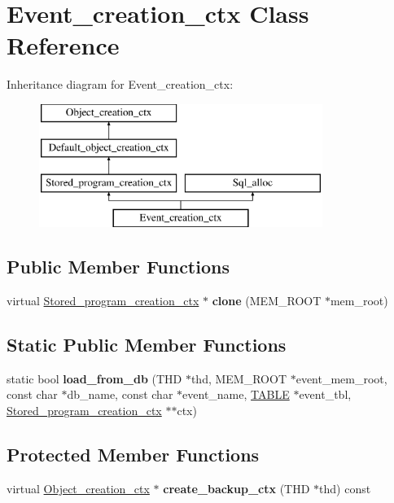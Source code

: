 \hypertarget{classEvent__creation__ctx}{}\section{Event\+\_\+creation\+\_\+ctx Class Reference}
\label{classEvent__creation__ctx}
Inheritance diagram for Event\+\_\+creation\+\_\+ctx\+:\begin{figure}[H]
\begin{center}
\leavevmode
\includegraphics[height=4.000000cm]{classEvent__creation__ctx}
\end{center}
\end{figure}
\subsection*{Public Member Functions}
\begin{DoxyCompactItemize}
\item 
\mbox{\label{classEvent__creation__ctx_abeef070386db4889aef81d6ff39d7818}} 
virtual \mbox{\hyperlink{classStored__program__creation__ctx}{Stored\+\_\+program\+\_\+creation\+\_\+ctx}} $\ast$ {\bfseries clone} (M\+E\+M\+\_\+\+R\+O\+OT $\ast$mem\+\_\+root)
\end{DoxyCompactItemize}
\subsection*{Static Public Member Functions}
\begin{DoxyCompactItemize}
\item 
static bool {\bfseries load\+\_\+from\+\_\+db} (T\+HD $\ast$thd, M\+E\+M\+\_\+\+R\+O\+OT $\ast$event\+\_\+mem\+\_\+root, const char $\ast$db\+\_\+name, const char $\ast$event\+\_\+name, \mbox{\hyperlink{structTABLE}{T\+A\+B\+LE}} $\ast$event\+\_\+tbl, \mbox{\hyperlink{classStored__program__creation__ctx}{Stored\+\_\+program\+\_\+creation\+\_\+ctx}} $\ast$$\ast$ctx)
\end{DoxyCompactItemize}
\subsection*{Protected Member Functions}
\begin{DoxyCompactItemize}
\item 
\mbox{\label{classEvent__creation__ctx_a4c7651af438323f69ccc5535d482e66b}} 
virtual \mbox{\hyperlink{classObject__creation__ctx}{Object\+\_\+creation\+\_\+ctx}} $\ast$ {\bfseries create\+\_\+backup\+\_\+ctx} (T\+HD $\ast$thd) const
\end{DoxyCompactItemize}
